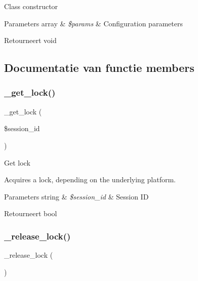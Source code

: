 Class constructor


\begin{DoxyParams}[1]{Parameters}
array & {\em \$params} & Configuration parameters \\
\hline
\end{DoxyParams}
\begin{DoxyReturn}{Retourneert}
void 
\end{DoxyReturn}


\subsection{Documentatie van functie members}
\mbox{\label{class_c_i___session__database__driver_a2c49c8e23be3e2aca96a9d20de18ffc2}} 
\subsubsection{\texorpdfstring{\_get\_lock()}{\_get\_lock()}}
{\footnotesize\ttfamily \+\_\+get\+\_\+lock (\begin{DoxyParamCaption}\item[{}]{\$session\+\_\+id }\end{DoxyParamCaption})\hspace{0.3cm}{\ttfamily [protected]}}

Get lock

Acquires a lock, depending on the underlying platform.


\begin{DoxyParams}[1]{Parameters}
string & {\em \$session\+\_\+id} & Session ID \\
\hline
\end{DoxyParams}
\begin{DoxyReturn}{Retourneert}
bool 
\end{DoxyReturn}
\mbox{\label{class_c_i___session__database__driver_a0265e356e6cf1eaba229663c1664c37d}} 
\subsubsection{\texorpdfstring{\_release\_lock()}{\_release\_lock()}}
{\footnotesize\ttfamily \+\_\+release\+\_\+lock (\begin{DoxyParamCaption}{ }\end{DoxyParamCaption})\hspace{0.3cm}{\ttfamily [protected]}}

